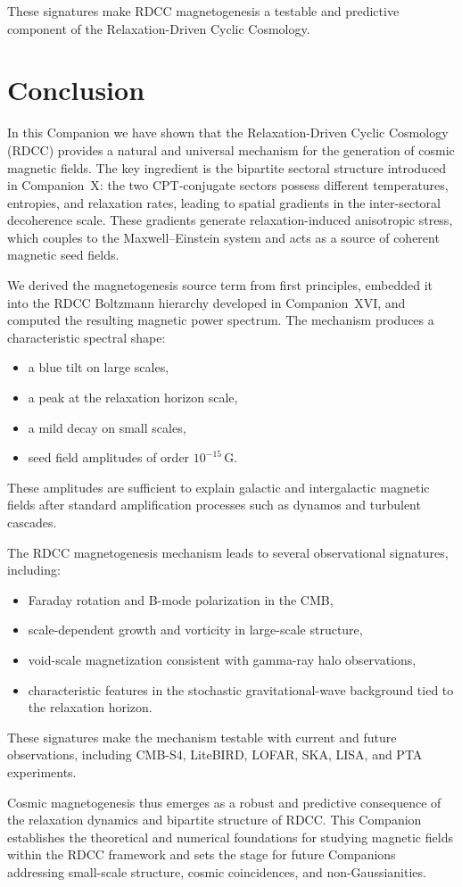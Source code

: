 \documentclass[11pt,a4paper]{article}
\begin{document}
These signatures make RDCC magnetogenesis a testable and predictive component of the
Relaxation-Driven Cyclic Cosmology.

\section{Conclusion}

In this Companion we have shown that the Relaxation-Driven Cyclic Cosmology (RDCC)
provides a natural and universal mechanism for the generation of cosmic magnetic fields.
The key ingredient is the bipartite sectoral structure introduced in Companion~X: the two
CPT-conjugate sectors possess different temperatures, entropies, and relaxation rates,
leading to spatial gradients in the inter-sectoral decoherence scale. These gradients generate
relaxation-induced anisotropic stress, which couples to the Maxwell–Einstein system and
acts as a source of coherent magnetic seed fields.

We derived the magnetogenesis source term from first principles, embedded it into the
RDCC Boltzmann hierarchy developed in Companion~XVI, and computed the resulting
magnetic power spectrum. The mechanism produces a characteristic spectral shape:
\begin{itemize}
\item a blue tilt on large scales,
\item a peak at the relaxation horizon scale,
\item a mild decay on small scales,
\item seed field amplitudes of order $10^{-15}\,\mathrm{G}$.
\end{itemize}

These amplitudes are sufficient to explain galactic and intergalactic magnetic fields after
standard amplification processes such as dynamos and turbulent cascades.

The RDCC magnetogenesis mechanism leads to several observational signatures, including:
\begin{itemize}
\item Faraday rotation and B-mode polarization in the CMB,
\item scale-dependent growth and vorticity in large-scale structure,
\item void-scale magnetization consistent with gamma-ray halo observations,
\item characteristic features in the stochastic gravitational-wave background tied to the
relaxation horizon.
\end{itemize}

These signatures make the mechanism testable with current and future observations,
including CMB-S4, LiteBIRD, LOFAR, SKA, LISA, and PTA experiments.

Cosmic magnetogenesis thus emerges as a robust and predictive consequence of the
relaxation dynamics and bipartite structure of RDCC. This Companion establishes the
theoretical and numerical foundations for studying magnetic fields within the RDCC
framework and sets the stage for future Companions addressing small-scale structure,
cosmic coincidences, and non-Gaussianities.
\end{document}
